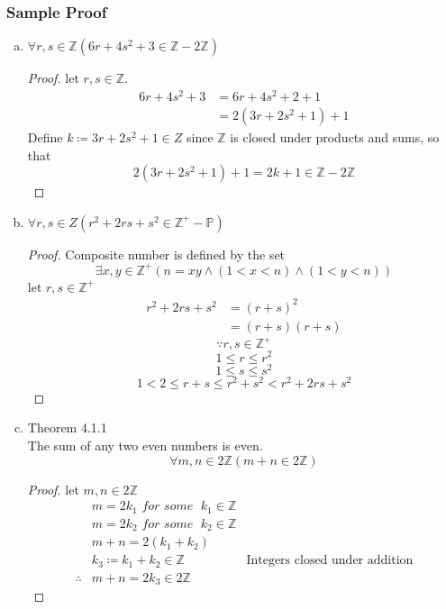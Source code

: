 \documentclass[12pt]{book}
\newcommand{\Z}{\mathbb{Z}}
\newcommand{\paren}[1]{\left( #1 \right)}
\begin{document}
\subsubsection{Sample Proof}
\begin{enumerate}[a.]
    \item $\forall r,s \in \Z \paren{6r+4s^2 +3 \in \Z - 2\Z}$
        \begin{proof} let $r,s \in \Z$.
            \begin{align*}
            6r+4s^2 +3  & = 6r +4s^2 +2 +1 \\
                        & = 2 (3r + 2s^2 +1) +1 
            \end{align*}
        Define $k\coloneqq 3r+2s^2 +1 \in Z$ since $\Z$ is closed under products and sums, so that 
        \[
        2 (3r + 2s^2 +1) +1 = 2k+1 \in \Z - 2\Z
        \]
        \end{proof}
    \item $\forall r,s \in Z \paren{r^2 + 2rs + s^2 \in \Z ^+ - \mathbb{P}}$
        \begin{proof} Composite number is defined by the set
        \[
        \exists x,y \in \Z ^+ \paren{n=xy \wedge \paren{1<x<n} \wedge \paren{1<y<n}}
        \]
        let $r,s \in \Z ^+$\\
            \begin{align*}
                r^2 + 2rs + s^2 
                &= (r+s)^2\\
                &=(r+s)(r+s)
            \end{align*}
            \[
            \because r,s\in \Z ^+ 
            \]
            \[
            1 \leq r \leq r^2
            \]
            \[
            1 \leq s \leq s^2
            \]
            \[
            1< 2 \leq r+s \leq r^2 + s^2 < r^2 + 2rs + s^2
            \]
            
        \end{proof}
    \item Theorem 4.1.1\\
        The sum of any two even numbers is even.
        \[
        \forall m,n \in 2\Z \paren{m+n \in 2\Z}
        \]
        \begin{proof}let $m,n \in 2\Z$
            \begin{align*}
                &m = 2k_1 \textit{ for some }\; k_1 \in \Z\\
                &m = 2k_2 \textit{ for some }\; k_2 \in \Z\\
                &m+n = 2\paren{k_1 + k_2}\\
                &k_3 \coloneqq k_1 + k_2 \in \Z 
                &\text{Integers closed under addition}\\
                \therefore & m+n = 2k_3 \in 2\Z
            \end{align*}
        \end{proof}
\end{enumerate}
\end{document}
